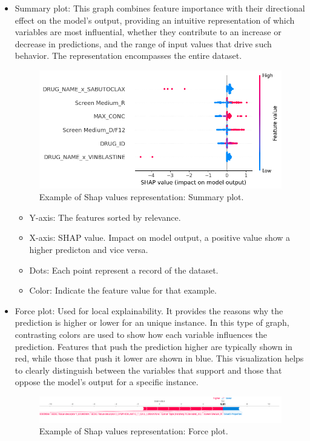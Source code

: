 \begin{itemize}
    \item Summary plot: This graph combines feature importance with their directional effect on the model's output, providing an intuitive representation of which variables are most influential, whether they contribute to an increase or decrease in predictions, and the range of input values that drive such behavior. The representation encompasses the entire dataset.
    
    \begin{figure}[H]
        \centering
        \includegraphics[width=1\textwidth]{figures/shap/shapValuesLittle.png}
        \caption{Example of Shap values representation: Summary plot.}
        \label{fig:summaryPlot}
    \end{figure}

    \begin{itemize}
        \item Y-axis: The features sorted by relevance.
        \item X-axis: SHAP value. Impact on model output, a positive value show a higher predicton and vice versa.
        \item Dots: Each point represent a record of the dataset.
        \item Color: Indicate the feature value for that example.
    \end{itemize}
    

    \item Force plot: Used for local explainability. It provides the reasons why the prediction is higher or lower for an unique instance. In this type of graph, contrasting colors are used to show how each variable influences the prediction. Features that push the prediction higher are typically shown in red, while those that push it lower are shown in blue. This visualization helps to clearly distinguish between the variables that support and those that oppose the model's output for a specific instance.
    \begin{figure}[H]
        \centering
        \includegraphics[width=1\textwidth]{figures/shap/force_plot.png}
        \caption{Example of Shap values representation: Force plot.}
        \label{fig:forcePlot}
    \end{figure}


\end{itemize}
